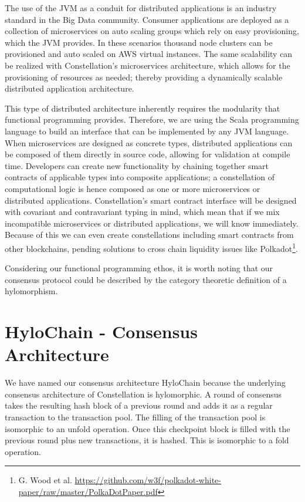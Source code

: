 \documentclass{article}
\begin{document}
The use of the JVM as a conduit for distributed applications is an industry standard in the Big Data community. Consumer applications are deployed as a collection of microservices on auto scaling groups which rely on easy provisioning, which the JVM provides. In these scenarios thousand node clusters can be provisioned and auto scaled on AWS virtual instances. The same scalability can be realized with Constellation's microservices architecture, which allows for the provisioning of resources as needed; thereby providing a dynamically scalable distributed application architecture. 

This type of distributed architecture inherently requires the modularity that functional programming provides. Therefore, we are using the Scala programming language to build an interface that can be implemented by any JVM language. When microservices are designed as concrete types, distributed applications can be composed of them directly in source code, allowing for validation at compile time. Developers can create new functionality by chaining together smart contracts of applicable types into composite applications; a constellation of computational logic is hence composed as one or more microservices or distributed applications. Constellation's smart contract interface will be designed with covariant and contravariant typing in mind, which mean that if we mix incompatible microservices or distributed applications, we will know immediately. Because of this we can even create constellations including smart contracts from other blockchains, pending solutions to cross chain liquidity issues like Polkadot\footnote{G. Wood et al. \url{https://github.com/w3f/polkadot-white-paper/raw/master/PolkaDotPaper.pdf}}.

Considering our functional programming ethos, it is worth noting that our consensus protocol could be described by the category theoretic definition of a hylomorphism.

\section{HyloChain - Consensus Architecture}
We have named our consensus architecture HyloChain because the underlying consensus architecture of Constellation is hylomorphic. A round of consensus takes the resulting hash block of a previous round and adds it as a regular transaction to the transaction pool. The filling of the transaction pool is isomorphic to an unfold operation. Once this checkpoint block is filled with the previous round plus new transactions, it is hashed. This is isomorphic to a fold operation. 
\end{document}
